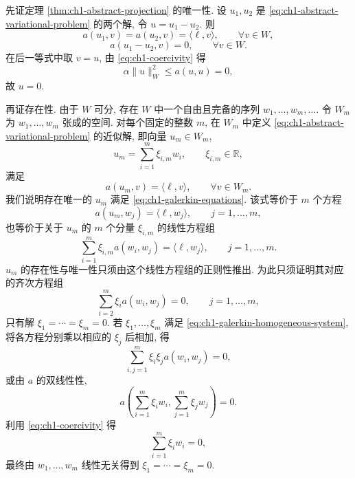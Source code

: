 \begin{Proof}
先证定理 \ref{thm:ch1-abstract-projection} 的唯一性. 设 $u_1,u_2$ 是 \eqref{eq:ch1-abstract-variational-problem} 的两个解, 令 $u=u_1-u_2$. 则
\[
a(u_1,v)=a(u_2,v)=\langle\ell,v\rangle,\qquad\forall v\in W,
\]
\[
a(u_1-u_2,v)=0,\qquad\forall v\in W.
\]
在后一等式中取 $v=u$, 由 \eqref{eq:ch1-coercivity} 得
\[
\alpha\lVert u\rVert_W^2\leq a(u,u)=0,
\]
故 $u=0$.

再证存在性. 由于 $W$ 可分, 存在 $W$ 中一个自由且完备的序列 $w_1,\ldots,w_m,\ldots$. 令 $W_m$ 为 $w_1,\ldots,w_m$ 张成的空间. 对每个固定的整数 $m$, 在 $W_m$ 中定义 \eqref{eq:ch1-abstract-variational-problem} 的近似解, 即向量 $u_m\in W_m$,
\begin{equation}
u_m=\sum_{i=1}^m\xi_{i,m}w_i,\qquad\xi_{i,m}\in\mathbb R,
\label{eq:ch1-galerkin-approximation}
\end{equation}
满足
\begin{equation}
a(u_m,v)=\langle\ell,v\rangle,\qquad\forall v\in W_m.
\label{eq:ch1-galerkin-equations}
\end{equation}
我们说明存在唯一的 $u_m$ 满足 \eqref{eq:ch1-galerkin-equations}. 该式等价于 $m$ 个方程
\begin{equation}
a(u_m,w_j)=\langle\ell,w_j\rangle,\qquad j=1,\ldots,m,
\label{eq:ch1-galerkin-basis-equations}
\end{equation}
也等价于关于 $u_m$ 的 $m$ 个分量 $\xi_{i,m}$ 的线性方程组
\begin{equation}
\sum_{i=1}^m\xi_{i,m}a(w_i,w_j)=\langle\ell,w_j\rangle,
\qquad j=1,\ldots,m.
\label{eq:ch1-galerkin-linear-system}
\end{equation}
$u_m$ 的存在性与唯一性只须由这个线性方程组的正则性推出. 为此只须证明其对应的齐次方程组
\begin{equation}
\sum_{i=2}^m\xi_i a(w_i,w_j)=0,\qquad j=1,\ldots,m,
\label{eq:ch1-galerkin-homogeneous-system}
\end{equation}
只有解 $\xi_1=\cdots=\xi_m=0$. 若 $\xi_1,\ldots,\xi_m$ 满足 \eqref{eq:ch1-galerkin-homogeneous-system}, 将各方程分别乘以相应的 $\xi_j$ 后相加, 得
\[
\sum_{i,j=1}^m\xi_i\xi_j a(w_i,w_j)=0,
\]
或由 $a$ 的双线性性,
\[
a\left(\sum_{i=1}^m\xi_iw_i,\sum_{j=1}^m\xi_jw_j\right)=0.
\]
利用 \eqref{eq:ch1-coercivity} 得
\[
\sum_{i=1}^m\xi_iw_i=0,
\]
最终由 $w_1,\ldots,w_m$ 线性无关得到 $\xi_1=\cdots=\xi_m=0$.


\end{Proof}
